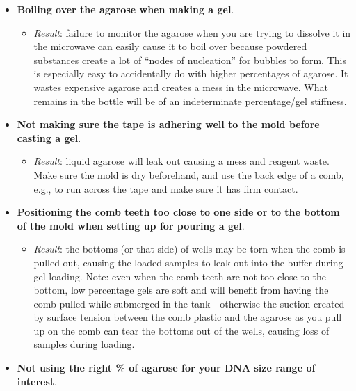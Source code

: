 \documentclass[
  letterpaper,
  DIV=11,
  numbers=noendperiod]{scrreprt}
\providecommand{\tightlist}{%
  \setlength{\itemsep}{0pt}\setlength{\parskip}{0pt}}\usepackage{longtable,booktabs,array}
\begin{document}
\begin{itemize}
\item
  \textbf{Boiling over the agarose when making a gel}.

  \begin{itemize}
  \tightlist
  \item
    \emph{Result}: failure to monitor the agarose when you are trying to
    dissolve it in the microwave can easily cause it to boil over
    because powdered substances create a lot of ``nodes of nucleation''
    for bubbles to form. This is especially easy to accidentally do with
    higher percentages of agarose. It wastes expensive agarose and
    creates a mess in the microwave. What remains in the bottle will be
    of an indeterminate percentage/gel stiffness.
  \end{itemize}
\item
  \textbf{Not making sure the tape is adhering well to the mold before
  casting a gel}.

  \begin{itemize}
  \tightlist
  \item
    \emph{Result}: liquid agarose will leak out causing a mess and
    reagent waste. Make sure the mold is dry beforehand, and use the
    back edge of a comb, e.g., to run across the tape and make sure it
    has firm contact.
  \end{itemize}
\item
  \textbf{Positioning the comb teeth too close to one side or to the
  bottom of the mold when setting up for pouring a gel}.

  \begin{itemize}
  \tightlist
  \item
    \emph{Result}: the bottoms (or that side) of wells may be torn when
    the comb is pulled out, causing the loaded samples to leak out into
    the buffer during gel loading. Note: even when the comb teeth are
    not too close to the bottom, low percentage gels are soft and will
    benefit from having the comb pulled while submerged in the tank -
    otherwise the suction created by surface tension between the comb
    plastic and the agarose as you pull up on the comb can tear the
    bottoms out of the wells, causing loss of samples during loading.
  \end{itemize}
\item
  \textbf{Not using the right \% of agarose for your DNA size range of
  interest}.


\end{itemize}
\end{document}
